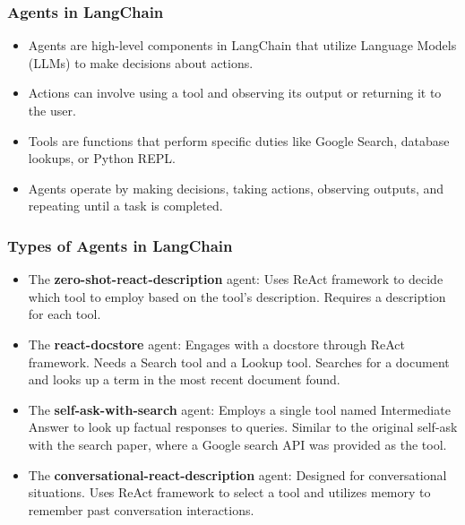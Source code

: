 \begin{frame}[fragile]
\frametitle{Agents in LangChain}

\begin{itemize}
    \item Agents are high-level components in LangChain that utilize Language Models (LLMs) to make decisions about actions.
    \item Actions can involve using a tool and observing its output or returning it to the user.
    \item Tools are functions that perform specific duties like Google Search, database lookups, or Python REPL.
    \item Agents operate by making decisions, taking actions, observing outputs, and repeating until a task is completed.
\end{itemize}

\end{frame}


\begin{frame}[fragile]
\frametitle{Types of Agents in LangChain}

\begin{itemize}
    \item The \textbf{zero-shot-react-description} agent: Uses ReAct framework to decide which tool to employ based on the tool's description. Requires a description for each tool.
    \item The \textbf{react-docstore} agent: Engages with a docstore through ReAct framework. Needs a Search tool and a Lookup tool. Searches for a document and looks up a term in the most recent document found.
    \item The \textbf{self-ask-with-search} agent: Employs a single tool named Intermediate Answer to look up factual responses to queries. Similar to the original self-ask with the search paper, where a Google search API was provided as the tool.
    \item The \textbf{conversational-react-description} agent: Designed for conversational situations. Uses ReAct framework to select a tool and utilizes memory to remember past conversation interactions.
\end{itemize}

\end{frame}

